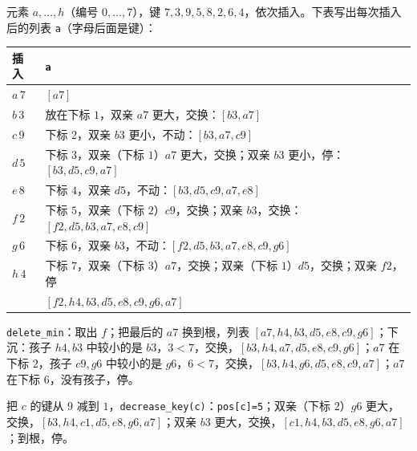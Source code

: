 \begin{example}\label{ex:mst-prim:binary}
元素 $a,\dots,h$（编号 $0,\dots,7$），键 $7,3,9,5,8,2,6,4$，依次插入。下表写出每次插入后的列表 \texttt{a}（字母后面是键）：
\begin{center}
\small
\begin{tabular}{ll}
\toprule
插入 & \texttt{a} \\
\midrule
$a\,7$ & $[a7]$ \\
$b\,3$ & 放在下标 $1$，双亲 $a7$ 更大，交换：$[b3,a7]$ \\
$c\,9$ & 下标 $2$，双亲 $b3$ 更小，不动：$[b3,a7,c9]$ \\
$d\,5$ & 下标 $3$，双亲（下标 $1$）$a7$ 更大，交换；双亲 $b3$ 更小，停：$[b3,d5,c9,a7]$ \\
$e\,8$ & 下标 $4$，双亲 $d5$，不动：$[b3,d5,c9,a7,e8]$ \\
$f\,2$ & 下标 $5$，双亲（下标 $2$）$c9$，交换；双亲 $b3$，交换：$[f2,d5,b3,a7,e8,c9]$ \\
$g\,6$ & 下标 $6$，双亲 $b3$，不动：$[f2,d5,b3,a7,e8,c9,g6]$ \\
$h\,4$ & 下标 $7$，双亲（下标 $3$）$a7$，交换；双亲（下标 $1$）$d5$，交换；双亲 $f2$，停 \\
& $[f2,h4,b3,d5,e8,c9,g6,a7]$ \\
\bottomrule
\end{tabular}
\end{center}
\begin{center}
\end{center}
\texttt{delete\_min}：取出 $f$；把最后的 $a7$ 换到根，列表 $[a7,h4,b3,d5,e8,c9,g6]$；下沉：孩子 $h4,b3$ 中较小的是 $b3$，$3<7$，交换，$[b3,h4,a7,d5,e8,c9,g6]$；$a7$ 在下标 $2$，孩子 $c9,g6$ 中较小的是 $g6$，$6<7$，交换，$[b3,h4,g6,d5,e8,c9,a7]$；$a7$ 在下标 $6$，没有孩子，停。

把 $c$ 的键从 $9$ 减到 $1$，\texttt{decrease\_key(c)}：\texttt{pos[c]=5}；双亲（下标 $2$）$g6$ 更大，交换，$[b3,h4,c1,d5,e8,g6,a7]$；双亲 $b3$ 更大，交换，$[c1,h4,b3,d5,e8,g6,a7]$；到根，停。
\end{example}

